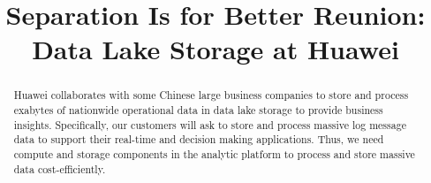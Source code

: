 \documentclass[sigconf, nonacm]{acmart}
\begin{document}
\title{Separation Is for Better Reunion: Data Lake Storage at Huawei}

\iffalse
\author{Ben Trovato}
\affiliation{%
  \institution{Institute for Clarity in Documentation}
  \streetaddress{P.O. Box 1212}
  \city{Dublin}
  \state{Ireland}
  \postcode{43017-6221}
}
\email{trovato@corporation.com}
\fi



\begin{abstract}
Huawei collaborates with some  Chinese large business companies to store and process exabytes of nationwide operational data in data lake storage to provide business insights.  
 Specifically, our customers will ask to store  and process massive  log message data to support their real-time and  decision making applications. Thus, we need compute and storage components in the analytic platform  to process and store massive data cost-efficiently. 




 
 
 

\end{abstract}
\end{document}
